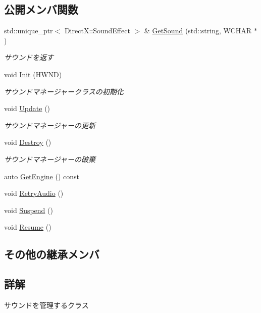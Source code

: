 \subsection*{公開メンバ関数}
\begin{DoxyCompactItemize}
\item 
std\+::unique\+\_\+ptr$<$ Direct\+X\+::\+Sound\+Effect $>$ \& \mbox{\hyperlink{class_sound_manager_ab97083f065caec6d4f59c246b1978faf}{Get\+Sound}} (std\+::string, W\+C\+H\+AR $\ast$)
\begin{DoxyCompactList}\small\item\em サウンドを返す \end{DoxyCompactList}\item 
void \mbox{\hyperlink{class_sound_manager_adab2bc016911756ffd973c7d781b5cfb}{Init}} (H\+W\+ND)
\begin{DoxyCompactList}\small\item\em サウンドマネージャークラスの初期化 \end{DoxyCompactList}\item 
void \mbox{\hyperlink{class_sound_manager_aaf241621221cdbefeba78e8b6bc29240}{Update}} ()
\begin{DoxyCompactList}\small\item\em サウンドマネージャーの更新 \end{DoxyCompactList}\item 
void \mbox{\hyperlink{class_sound_manager_abf0d473d0a31323c8e74684976b08e7f}{Destroy}} ()
\begin{DoxyCompactList}\small\item\em サウンドマネージャーの破棄 \end{DoxyCompactList}\item 
auto \mbox{\hyperlink{class_sound_manager_a5a575ac572eb0b50b3bb48b879a1a7e6}{Get\+Engine}} () const
\item 
void \mbox{\hyperlink{class_sound_manager_acc9fb61509f30c7eb9136386eeeb9f94}{Retry\+Audio}} ()
\item 
void \mbox{\hyperlink{class_sound_manager_a97d76cb22596fbb3c85766df0dcde757}{Suspend}} ()
\item 
void \mbox{\hyperlink{class_sound_manager_a6107940d2299131fbd7991a4f222491b}{Resume}} ()
\end{DoxyCompactItemize}
\subsection*{その他の継承メンバ}


\subsection{詳解}
サウンドを管理するクラス 

